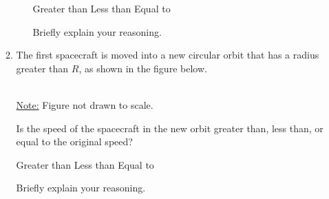 \documentclass{../../../oss-apphys}
\begin{document}
\begin{enumerate}
\begin{enumerate}
\begin{enumerate}
      \vspace{.1in}
      \underline{\hspace{.3in}}Greater than\hspace{.2in}
      \underline{\hspace{.3in}}Less than\hspace{.2in}
      \underline{\hspace{.3in}}Equal to
      
      \vspace{.1in}Briefly explain your reasoning.
    \end{enumerate}
    
  \item The first spacecraft is moved into a new circular orbit that has a
    radius greater than $R$, as shown in the figure below.
    \begin{center}
      \\
      \underline{Note:} Figure not drawn to scale.
    \end{center}
    Is the speed of the spacecraft in the new orbit greater than, less than, or
    equal to the original speed?
    
    \vspace{.1in}
    \underline{\hspace{.3in}}Greater than\hspace{.2in}
    \underline{\hspace{.3in}}Less than\hspace{.2in}
    \underline{\hspace{.3in}}Equal to
      
    \vspace{.1in}Briefly explain your reasoning.   
  \end{enumerate}
  \newpage
  

\end{enumerate}
\end{document}
